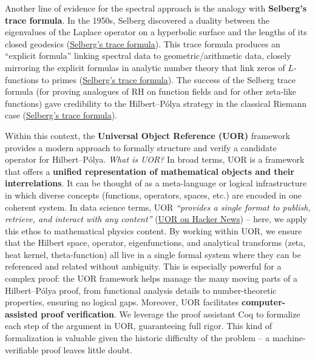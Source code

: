 \documentclass[12pt]{article}
\theoremstyle{plain}
\theoremstyle{definition}
\begin{document}
Another line of evidence for the spectral approach is the analogy with \textbf{Selberg's trace formula}. In the 1950s, Selberg discovered a duality between the eigenvalues of the Laplace operator on a hyperbolic surface and the lengths of its closed geodesics (\href{https://en.wikipedia.org/wiki/Hilbert%E2%80%93P%C3%B3lya_conjecture#:~:text=At%20the%20time%20of%20P%C3%B3lya%27s,credibility%20to%20the%20Hilbert%E2%80%93P%C3%B3lya%20conjecture}{Selberg's trace formula}). This trace formula produces an ``explicit formula'' linking spectral data to geometric/arithmetic data, closely mirroring the explicit formulas in analytic number theory that link zeros of $L$-functions to primes (\href{https://en.wikipedia.org/wiki/Hilbert%E2%80%93P%C3%B3lya_conjecture#:~:text=At%20the%20time%20of%20P%C3%B3lya%27s,credibility%20to%20the%20Hilbert%E2%80%93P%C3%B3lya%20conjecture}{Selberg's trace formula}). The success of the Selberg trace formula (for proving analogues of RH on function fields and for other zeta-like functions) gave credibility to the Hilbert--P\'olya strategy in the classical Riemann case (\href{https://en.wikipedia.org/wiki/Hilbert%E2%80%93P%C3%B3lya_conjecture#:~:text=At%20the%20time%20of%20P%C3%B3lya%27s,credibility%20to%20the%20Hilbert%E2%80%93P%C3%B3lya%20conjecture}{Selberg's trace formula}).

Within this context, the \textbf{Universal Object Reference (UOR)} framework provides a modern approach to formally structure and verify a candidate operator for Hilbert--P\'olya. \textit{What is UOR?} In broad terms, UOR is a framework that offers a \textbf{unified representation of mathematical objects and their interrelations}. It can be thought of as a meta-language or logical infrastructure in which diverse concepts (functions, operators, spaces, etc.) are encoded in one coherent system. In data science terms, UOR \textit{``provides a single format to publish, retrieve, and interact with any content''} (\href{https://news.ycombinator.com/item?id=32193220#:~:text=News%20news,and%20interact%20with%20any%20content}{UOR on Hacker News}) -- here, we apply this ethos to mathematical physics content. By working within UOR, we ensure that the Hilbert space, operator, eigenfunctions, and analytical transforms (zeta, heat kernel, theta-function) all live in a single formal system where they can be referenced and related without ambiguity. This is especially powerful for a complex proof: the UOR framework helps manage the many moving parts of a Hilbert--P\'olya proof, from functional analysis details to number-theoretic properties, ensuring no logical gaps. Moreover, UOR facilitates \textbf{computer-assisted proof verification}. We leverage the proof assistant Coq to formalize each step of the argument in UOR, guaranteeing full rigor. This kind of formalization is valuable given the historic difficulty of the problem -- a machine-verifiable proof leaves little doubt.
\end{document}
